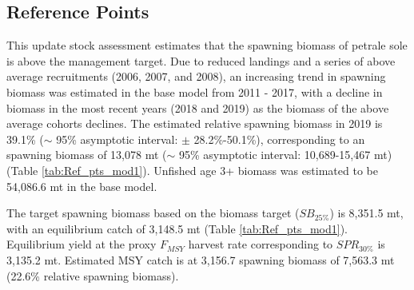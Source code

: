 \documentclass[12pt,]{article}
\begin{document}
\subsection*{Reference Points}\label{reference-points}

This update stock assessment estimates that the spawning biomass of
petrale sole is above the management target. Due to reduced landings and
a series of above average recruitments (2006, 2007, and 2008), an
increasing trend in spawning biomass was estimated in the base model
from 2011 - 2017, with a decline in biomass in the most recent years
(2018 and 2019) as the biomass of the above average cohorts declines.
The estimated relative spawning biomass in 2019 is 39.1\% (\(\sim\) 95\%
asymptotic interval: \(\pm\) 28.2\%-50.1\%), corresponding to an
spawning biomass of 13,078 mt (\(\sim\) 95\% asymptotic interval:
10,689-15,467 mt) (Table \ref{tab:Ref_pts_mod1}). Unfished age 3+
biomass was estimated to be 54,086.6 mt in the base model.

The target spawning biomass based on the biomass target (\(SB_{25\%}\))
is 8,351.5 mt, with an equilibrium catch of 3,148.5 mt (Table
\ref{tab:Ref_pts_mod1}). Equilibrium yield at the proxy \(F_{MSY}\)
harvest rate corresponding to \(SPR_{30\%}\) is 3,135.2 mt. Estimated
MSY catch is at 3,156.7 spawning biomass of 7,563.3 mt (22.6\% relative
spawning biomass).
\end{document}
